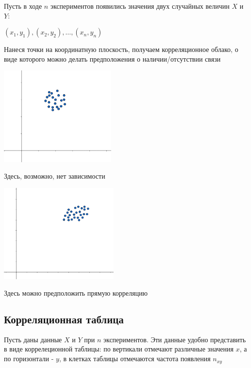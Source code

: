 \documentclass[12pt]{article}
\begin{document}
Пусть в ходе $n$ экспериментов появились значения двух случайных величин $X$ и $Y$: 

$(x_1, y_1), (x_2, y_2), \dots, (x_n, y_n)$

Нанеся точки на координатную плоскость, получаем корреляционное облако, о виде которого можно делать предположения о наличии/отсутствии связи


\Ex 

\begin{multicols}{2}
    \begin{center}
        \includegraphics[height=5cm]{mathstat/images/mathstat_2025_04_01_1}

        Здесь, возможно, нет зависимости

        \includegraphics[height=5cm]{mathstat/images/mathstat_2025_04_01_2}

        Здесь можно предположить прямую корреляцию
    \end{center}
\end{multicols}

\subsection{Корреляционная таблица}

Пусть даны данные $X$ и $Y$ при $n$ экспериментов. Эти данные удобно представить в виде коррелеционной таблицы:
по вертикали отмечают различные значения $x$, а по горизонтали - $y$, в клетках таблицы отмечаются частота появления $n_{xy}$
\end{document}
